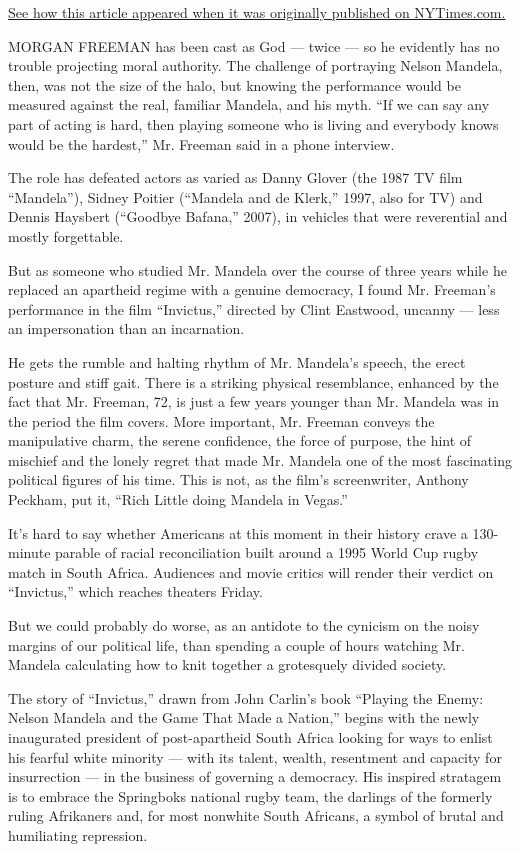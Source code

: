 \href{https://archive.nytimes3xbfgragh.onion/www.nytimes3xbfgragh.onion/2009/12/06/movies/06invictus.html}{See
how this article appeared when it was originally published on
NYTimes.com.}

MORGAN FREEMAN has been cast as God --- twice --- so he evidently has no
trouble projecting moral authority. The challenge of portraying Nelson
Mandela, then, was not the size of the halo, but knowing the performance
would be measured against the real, familiar Mandela, and his myth. ``If
we can say any part of acting is hard, then playing someone who is
living and everybody knows would be the hardest,'' Mr. Freeman said in a
phone interview.

The role has defeated actors as varied as Danny Glover (the 1987 TV film
``Mandela''), Sidney Poitier (``Mandela and de Klerk,'' 1997, also for
TV) and Dennis Haysbert (``Goodbye Bafana,'' 2007), in vehicles that
were reverential and mostly forgettable.

But as someone who studied Mr. Mandela over the course of three years
while he replaced an apartheid regime with a genuine democracy, I found
Mr. Freeman's performance in the film ``Invictus,'' directed by Clint
Eastwood, uncanny --- less an impersonation than an incarnation.

He gets the rumble and halting rhythm of Mr. Mandela's speech, the erect
posture and stiff gait. There is a striking physical resemblance,
enhanced by the fact that Mr. Freeman, 72, is just a few years younger
than Mr. Mandela was in the period the film covers. More important, Mr.
Freeman conveys the manipulative charm, the serene confidence, the force
of purpose, the hint of mischief and the lonely regret that made Mr.
Mandela one of the most fascinating political figures of his time. This
is not, as the film's screenwriter, Anthony Peckham, put it, ``Rich
Little doing Mandela in Vegas.''

It's hard to say whether Americans at this moment in their history crave
a 130-minute parable of racial reconciliation built around a 1995 World
Cup rugby match in South Africa. Audiences and movie critics will render
their verdict on ``Invictus,'' which reaches theaters Friday.

But we could probably do worse, as an antidote to the cynicism on the
noisy margins of our political life, than spending a couple of hours
watching Mr. Mandela calculating how to knit together a grotesquely
divided society.

The story of ``Invictus,'' drawn from John Carlin's book ``Playing the
Enemy: Nelson Mandela and the Game That Made a Nation,'' begins with the
newly inaugurated president of post-apartheid South Africa looking for
ways to enlist his fearful white minority --- with its talent, wealth,
resentment and capacity for insurrection --- in the business of
governing a democracy. His inspired stratagem is to embrace the
Springboks national rugby team, the darlings of the formerly ruling
Afrikaners and, for most nonwhite South Africans, a symbol of brutal and
humiliating repression.

